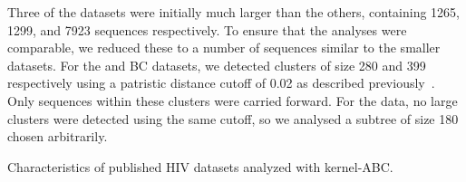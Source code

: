 Three of the datasets \autocite[][and the BC data]{li2015hiv,novitsky2014impact}
were initially much larger than the others, containing 1265, 1299, and 7923
sequences respectively. To ensure that the analyses were comparable, we reduced
these to a number of sequences similar to the smaller datasets. For the
\citeauthor{li2015hiv} and BC datasets, we detected clusters of size 280 and
399 respectively using a patristic distance cutoff of 0.02 as described
previously~\autocite{poon2015impact}. Only sequences within these clusters were
carried forward. For the \textcite{novitsky2014impact} data, no large clusters
were detected using the same cutoff, so we analysed a subtree of size 180
chosen arbitrarily.

\begin{table}[ht]
  \centering
  
  \caption{Characteristics of published HIV datasets analyzed with kernel-ABC.}
  \label{tab:realdata}
\end{table}
